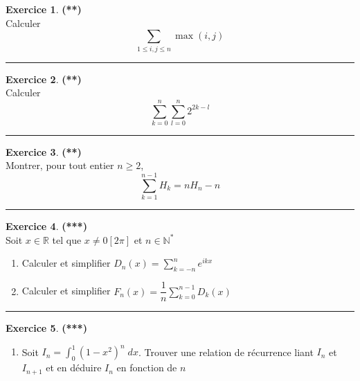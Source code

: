 \documentclass[a4paper,11pt]{article}
\theoremstyle{definition}
\newtheorem{exo}{Exercice} %
\begin{document}
\begin{minipage}{1\linewidth}
\begin{minipage}[c]{0.48\linewidth}
		\begin{exo}\textbf{(**)}\quad\\[0.2cm]
			Calculer $$\displaystyle\sum_{1 \leq i,j \leq n}{\max(i,j)}$$
			
			\centering
			\rule{1\linewidth}{0.6pt}
		\end{exo}
		
		
		
		
		
	\end{minipage}	
	\hfill\vrule\hfill
	\begin{minipage}[c]{0.48\linewidth}
		\raggedright
		
		\begin{exo}\textbf{(**)}\quad\\[0.2cm]
			
			
			Calculer $$\displaystyle\sum_{k=0}^{n}{\displaystyle\sum_{l=0}^{n}{2^{2k-l}}}$$
			
			\centering
			\rule{1\linewidth}{0.6pt}
		\end{exo}
		
		\begin{exo}\textbf{(**)}\quad\\[0.2cm]
			Montrer, pour tout entier $n \geq 2$,
			$$\sum_{k=1}^{n-1}{H_k}=n H_n - n$$
			\centering
			\rule{1\linewidth}{0.6pt}
		\end{exo}

		
		
	\begin{exo}\textbf{(***)}\quad\\[0.2cm]
		
		Soit $x \in \mathbb{R}$ tel que $x \neq 0 [2 \pi]$ et $n \in \mathbb{N}^{*}$
		\begin{enumerate}
			\item Calculer et simplifier $D_n(x) = \displaystyle\sum_{k=-n}^{n}{e^{ikx}}$
			\item Calculer et simplifier $F_n(x) = \dfrac{1}{n} \displaystyle\sum_{k=0}^{n-1}{D_k(x)}$
		\end{enumerate}
		
		
		\centering
		\rule{1\linewidth}{0.6pt}
	\end{exo}

		\begin{exo}\textbf{(***)}\quad\\[0.2cm]
	\begin{enumerate}
		\item Soit $I_n=\int_{0}^{1}(1-x^2)^n\;dx$. Trouver une relation de récurrence liant $I_n$ et $I_{n+1}$ et en déduire
		$I_n$ en fonction de $n$ 
		

\end{enumerate}
\end{exo}
\end{minipage}
\end{minipage}
\end{document}
